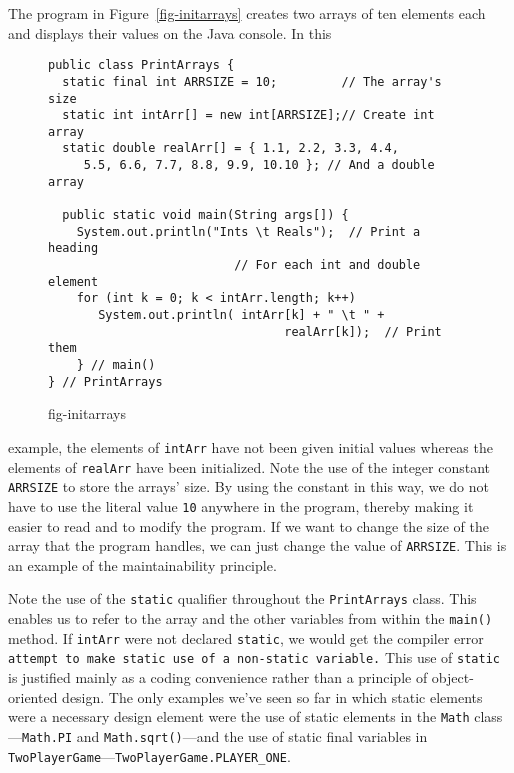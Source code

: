 \noindent The program in Figure~\ref{fig-initarrays} creates two arrays of ten
elements each and displays their values on the Java console.   In this
\begin{figure}[h!]
\jjjprogstart
\begin{jjjlisting}[27pc]
\begin{lstlisting}
public class PrintArrays { 
  static final int ARRSIZE = 10;         // The array's size
  static int intArr[] = new int[ARRSIZE];// Create int array
  static double realArr[] = { 1.1, 2.2, 3.3, 4.4,
     5.5, 6.6, 7.7, 8.8, 9.9, 10.10 }; // And a double array

  public static void main(String args[]) {
    System.out.println("Ints \t Reals");  // Print a heading
                          // For each int and double element
    for (int k = 0; k < intArr.length; k++) 
       System.out.println( intArr[k] + " \t " + 
                                 realArr[k]);  // Print them
    } // main()
} // PrintArrays
\end{lstlisting}
\end{jjjlisting}
{fig-initarrays}
\end{figure} 
\noindent example, the elements of \mbox{\tt intArr} have not been
given initial values whereas the elements of \mbox{\tt realArr} have been
initialized.  Note the use of the integer constant
\mbox{\tt ARRSIZE} to store the arrays' size.  By using the constant
in this way, we do not have to use the literal value {\tt 10} anywhere
in the program, thereby making it easier to read and to modify the
program.  If we want to change the size of the array that the program
handles, we can just change the value of {\tt ARRSIZE}. This is an
example
of the maintainability
principle.




\noindent Note the use of the {\tt static} qualifier throughout the
{\tt PrintArrays} class. This enables us to refer to the array
and the other variables from within the {\tt main()} method. 
\label{fig:printarraysout}
 If {\tt intArr} were not declared {\tt static}, we would get the
compiler error {\tt attempt to make static use of a non-static variable.}
This use of {\tt static} is justified mainly as a coding convenience
rather than a principle of object-oriented design. The only examples
we've seen so far in which static elements were a necessary design
element were the use of static elements in the {\tt Math} class---{\tt Math.PI} 
and {\tt Math.sqrt()}---and the use of static
final variables in {\tt TwoPlayerGame}---{\tt TwoPlayerGame.PLAYER\_ONE}.

